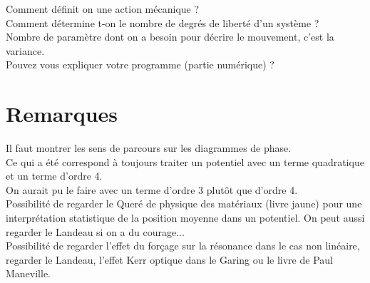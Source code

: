 \documentclass[12pt,prb,aps,epsf]{article}
\begin{document}
Comment définit on une action mécanique ?\\

Comment détermine t-on le nombre de degrés de liberté d'un système ?\\
Nombre de paramètre dont on a besoin pour décrire le mouvement, c'est la variance.\\

Pouvez vous expliquer votre programme (partie numérique) ?\\

\section*{Remarques}
Il faut montrer les sens de parcours sur les diagrammes de phase.\\

Ce qui a été correspond à toujours traiter un potentiel avec un terme quadratique et un terme d'ordre 4.\\

On aurait pu le faire avec un terme d'ordre 3 plutôt que d'ordre 4.\\

Possibilité de regarder le Queré de physique des matériaux (livre jaune) pour une interprétation statistique de la position moyenne dans un potentiel. On peut aussi regarder le Landeau si on a du courage...\\

Possibilité de regarder l'effet du forçage sur la résonance dans le cas non linéaire, regarder le Landeau, l'effet Kerr optique dans le Garing ou le livre de Paul Maneville.\\


	
\end{document}
